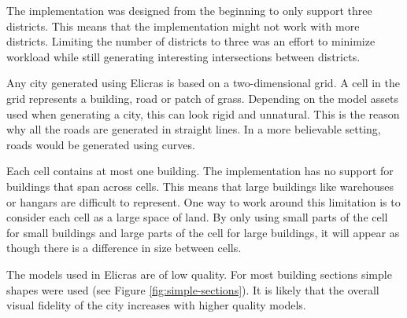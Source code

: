 The implementation was designed from the beginning to only support three districts. This means that the implementation might not work with more districts. Limiting the number of districts to three was an effort to minimize workload while still generating interesting intersections between districts.
\par
Any city generated using Elicras is based on a two-dimensional grid. A cell in the grid represents a building, road or patch of grass. Depending on the model assets used when generating a city, this can look rigid and unnatural. This is the reason why all the roads are generated in straight lines. In a more believable setting, roads would be generated using curves\cite{CurvedRoads}.
\par
Each cell contains at most one building. The implementation has no support for buildings that span across cells. This means that large buildings like warehouses or hangars are difficult to represent. One way to work around this limitation is to consider each cell as a large space of land. By only using small parts of the cell for small buildings and large parts of the cell for large buildings, it will appear as though there is a difference in size between cells.
\par
The models used in Elicras are of low quality. For most building sections simple shapes were used (see Figure \ref{fig:simple-sections}). It is likely that the overall visual fidelity of the city increases with higher quality models.

